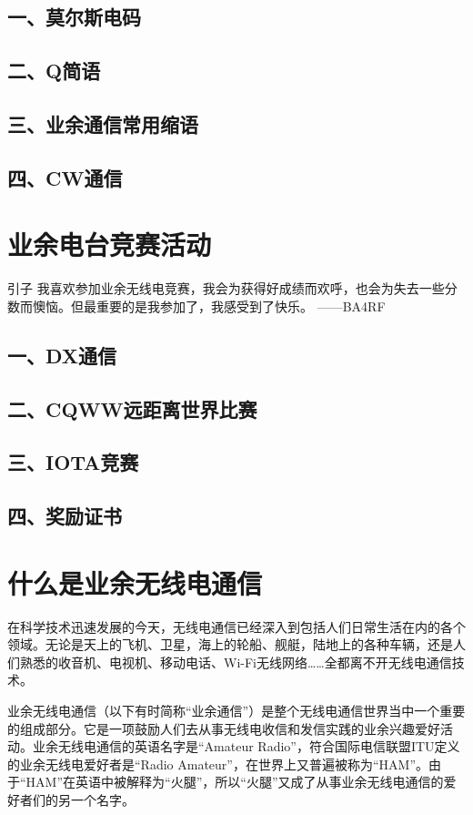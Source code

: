 \documentclass[12pt,UTF8]{ctexbook}
\begin{document}
\section{一、莫尔斯电码}
\section{二、Q简语}
\section{三、业余通信常用缩语}
\section{四、CW通信}

\chapter{业余电台竞赛活动}
引子
我喜欢参加业余无线电竞赛，我会为获得好成绩而欢呼，也会为失去一些分数而懊恼。但最重要的是我参加了，我感受到了快乐。
——BA4RF
\section{一、DX通信}
\section{二、CQWW远距离世界比赛}
\section{三、IOTA竞赛}
\section{四、奖励证书}


\chapter{什么是业余无线电通信}

在科学技术迅速发展的今天，无线电通信已经深入到包括人们日常生活在内的各个领域。无论是天上的飞机、卫星，海上的轮船、舰艇，陆地上的各种车辆，还是人们熟悉的收音机、电视机、移动电话、Wi-Fi无线网络……全都离不开无线电通信技术。

业余无线电通信（以下有时简称“业余通信”）是整个无线电通信世界当中一个重要的组成部分。它是一项鼓励人们去从事无线电收信和发信实践的业余兴趣爱好活动。业余无线电通信的英语名字是“Amateur Radio”，符合国际电信联盟ITU定义的业余无线电爱好者是“Radio Amateur”，在世界上又普遍被称为“HAM”。由于“HAM”在英语中被解释为“火腿”，所以“火腿”又成了从事业余无线电通信的爱好者们的另一个名字。
\end{document}
